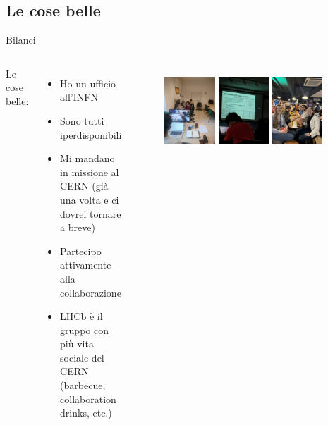 \documentclass[
10pt,
aspectratio=169,
]{beamer}
\begin{document}
\subsection{Le cose belle}
\begin{frame}{Bilanci}
\begin{columns}
    Le cose belle:
\begin{itemize}
    \item Ho un ufficio all'INFN
    \item Sono tutti iperdisponibili
    \item Mi mandano in missione al CERN (già una volta e ci dovrei tornare a breve)
    \item Partecipo attivamente alla collaborazione
    \item LHCb è il gruppo con più vita sociale del CERN (barbecue, collaboration drinks, etc.)
    \end{itemize}
    \begin{figure}
        \centering
        \includegraphics[width=0.3\textwidth]{figures/office.jpeg}
                \includegraphics[width=0.3\textwidth]{figures/mio_plot.jpeg}
        \includegraphics[width=0.3\textwidth]{figures/birra.jpeg}


\end{figure}
\end{columns}
\end{frame}
\end{document}
